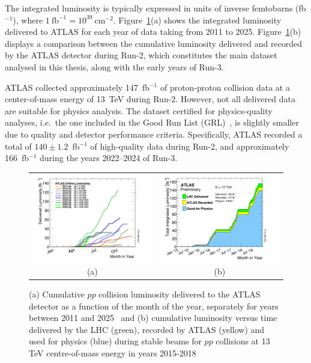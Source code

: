 The integrated luminosity is typically expressed in units of inverse femtobarns (fb$^{-1}$), where $1~\text{fb}^{-1} = 10^{39}~\text{cm}^{-2}$. Figure~\ref{figure:Run3lumi}(a) shows the integrated luminosity delivered to ATLAS for each year of data taking from 2011 to 2025. Figure~\ref{figure:Run3lumi}(b) displays a comparison between the cumulative luminosity delivered and recorded by the ATLAS detector during Run-2, which constitutes the main dataset analysed in this thesis, along with the early years of Run-3.

ATLAS collected approximately 147~fb$^{-1}$ of proton-proton collision data at a center-of-mass energy of 13~TeV during Run-2. However, not all delivered data are suitable for physics analysis. The dataset certified for physics-quality analyses, i.e.\ the one included in the Good Run List (GRL)~\cite{Aad_2020}, is slightly smaller due to quality and detector performance criteria. Specifically, ATLAS recorded a total of $140 \pm 1.2$~fb$^{-1}$ of high-quality data during Run-2, and approximately 166~fb$^{-1}$ during the years 2022--2024 of Run-3.

\begin{figure}[htbp]
\centering
\begin{tabular}{cc}
    \includegraphics[width=0.5\linewidth]{images/intlumivsyear.png} &
    \includegraphics[width=0.5\linewidth]{images/intlumivstimeRun2DQall.png} \\
    (a) & (b)  \\
\end{tabular}
\caption{(a) Cumulative $pp$ collision luminosity delivered to the ATLAS detector as a function of the month
of the year, separately for years between 2011 and 2025~\cite{atlas:Run3lumi} and (b) cumulative luminosity versus
time delivered by the LHC (green), recorded by ATLAS (yellow) and used for physics (blue)
during stable beams for $pp$ collisions at 13 TeV centre-of-mass energy in years 2015-2018~\cite{atlas:Run2lumi}}
\label{figure:Run3lumi}
\end{figure}


